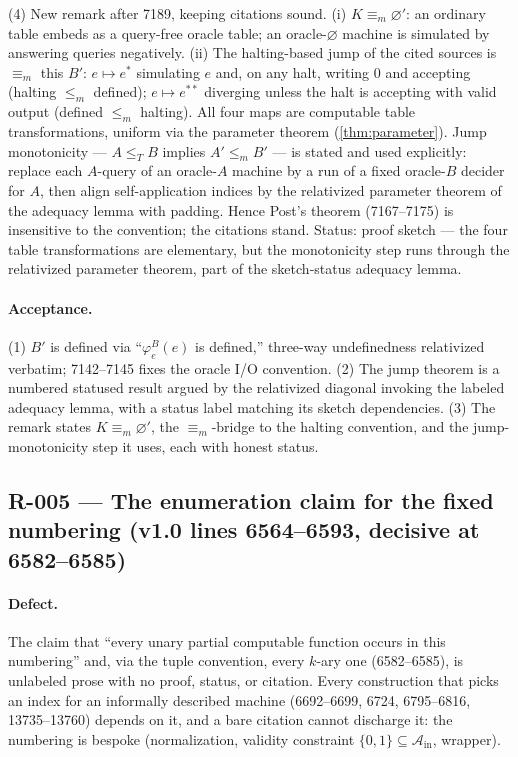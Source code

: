(4) New remark after 7189, keeping citations sound.  (i) \(K\equiv_m\varnothing'\): an ordinary table embeds as a query-free oracle table; an oracle-\(\varnothing\) machine is simulated by answering queries negatively.  (ii) The halting-based jump of the cited sources is \(\equiv_m\) this \(B'\): \(e\mapsto e^*\) simulating \(e\) and, on any halt, writing \(0\) and accepting (halting \(\leq_m\) defined); \(e\mapsto e^{**}\) diverging unless the halt is accepting with valid output (defined \(\leq_m\) halting).  All four maps are computable table transformations, uniform via the parameter theorem (\cref{thm:parameter}).  Jump monotonicity --- \(A\leq_T B\) implies \(A'\leq_m B'\) --- is stated and used explicitly: replace each \(A\)-query of an oracle-\(A\) machine by a run of a fixed oracle-\(B\) decider for \(A\), then align self-application indices by the relativized parameter theorem of the adequacy lemma with padding.  Hence Post's theorem (7167--7175) is insensitive to the convention; the citations stand.  Status: proof sketch --- the four table transformations are elementary, but the monotonicity step runs through the relativized parameter theorem, part of the sketch-status adequacy lemma.

\paragraph{Acceptance.} (1) \(B'\) is defined via ``\(\varphi^B_e(e)\) is defined,'' three-way undefinedness relativized verbatim; 7142--7145 fixes the oracle I/O convention.  (2) The jump theorem is a numbered statused result argued by the relativized diagonal invoking the labeled adequacy lemma, with a status label matching its sketch dependencies.  (3) The remark states \(K\equiv_m\varnothing'\), the \(\equiv_m\)-bridge to the halting convention, and the jump-monotonicity step it uses, each with honest status.

\subsection*{R-005 --- The enumeration claim for the fixed numbering (v1.0 lines 6564--6593, decisive at 6582--6585)}

\paragraph{Defect.} The claim that ``every unary partial computable function occurs in this numbering'' and, via the tuple convention, every \(k\)-ary one (6582--6585), is unlabeled prose with no proof, status, or citation.  Every construction that picks an index for an informally described machine (6692--6699, 6724, 6795--6816, 13735--13760) depends on it, and a bare citation cannot discharge it: the numbering is bespoke (normalization, validity constraint \(\{0,1\}\subseteq\mathcal A_{\mathrm{in}}\), wrapper).

